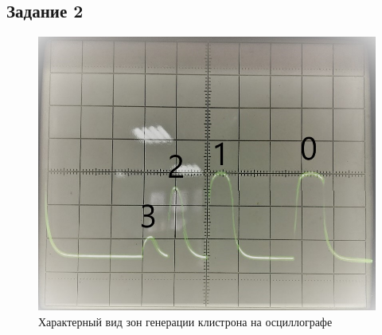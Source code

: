 \subsection{Задание 2}
\begin{figure}[h]
	\centering
	\includegraphics[width=0.5\linewidth]{photo/img2}
	\caption{Характерный вид зон генерации клистрона на осциллографе}
	\label{fig:img1}
\end{figure}

